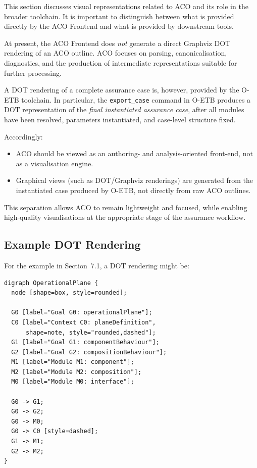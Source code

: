 \documentclass[11pt]{article}
\begin{document}
This section discusses visual representations related to ACO and its role in the
broader toolchain. It is important to distinguish between what is provided directly
by the ACO Frontend and what is provided by downstream tools.

At present, the ACO Frontend does \emph{not} generate a direct Graphviz DOT rendering
of an ACO outline. ACO focuses on parsing, canonicalisation, diagnostics, and the
production of intermediate representations suitable for further processing.

A DOT rendering of a complete assurance case is, however, provided by the O-ETB
toolchain. In particular, the \texttt{export\_case} command in O-ETB produces a DOT
representation of the \emph{final instantiated assurance case}, after all modules
have been resolved, parameters instantiated, and case-level structure fixed.

Accordingly:
\begin{itemize}[leftmargin=2em]
  \item ACO should be viewed as an authoring- and analysis-oriented front-end,
        not as a visualisation engine.
  \item Graphical views (such as DOT/Graphviz renderings) are generated from the
        instantiated case produced by O-ETB, not directly from raw ACO outlines.
\end{itemize}

This separation allows ACO to remain lightweight and focused, while enabling
high-quality visualisations at the appropriate stage of the assurance workflow.

\subsection{Example DOT Rendering}

For the example in Section~7.1, a DOT rendering might be:

\begin{verbatim}
digraph OperationalPlane {
  node [shape=box, style=rounded];

  G0 [label="Goal G0: operationalPlane"];
  C0 [label="Context C0: planeDefinition",
      shape=note, style="rounded,dashed"];
  G1 [label="Goal G1: componentBehaviour"];
  G2 [label="Goal G2: compositionBehaviour"];
  M1 [label="Module M1: component"];
  M2 [label="Module M2: composition"];
  M0 [label="Module M0: interface"];

  G0 -> G1;
  G0 -> G2;
  G0 -> M0;
  G0 -> C0 [style=dashed];
  G1 -> M1;
  G2 -> M2;
}
\end{verbatim}
\end{document}
